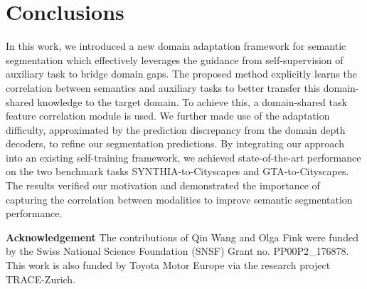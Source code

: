 \documentclass[10pt,twocolumn,letterpaper]{article}
\begin{document}
\section{Conclusions}
In this work, we introduced a new domain adaptation framework for semantic segmentation which effectively leverages the guidance from self-supervision of auxiliary task to bridge domain gaps. The proposed method explicitly learns the correlation between semantics and auxiliary tasks to better transfer this domain-shared knowledge to the target domain. To achieve this, a domain-shared task feature correlation module is used. We further made use of the adaptation difficulty, approximated by the prediction discrepancy from the domain depth decoders, to refine our segmentation predictions. By integrating our approach into an existing self-training framework, we achieved state-of-the-art performance on the two benchmark tasks SYNTHIA-to-Cityscapes and GTA-to-Cityscapes. The results verified our motivation and demonstrated the importance of capturing the correlation between modalities to improve semantic segmentation performance. 


\noindent
\textbf{Acknowledgement} 
The contributions of Qin Wang and Olga Fink were funded by the Swiss National Science Foundation (SNSF) Grant no. PP00P2\_176878. This work is also funded by Toyota Motor Europe via the research project TRACE-Zurich.

{\small


}
\end{document}
